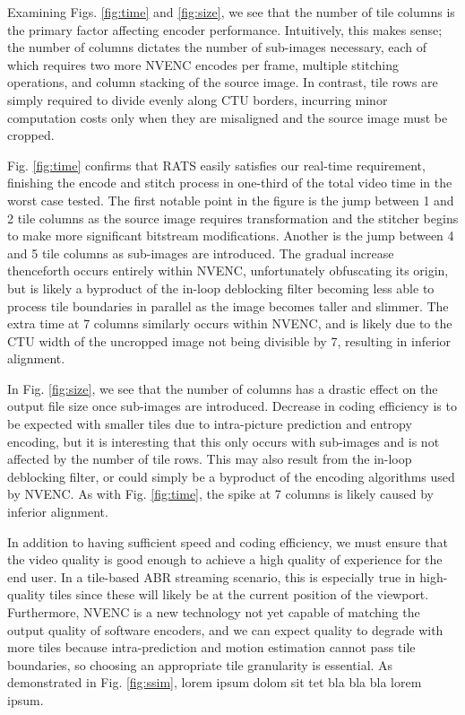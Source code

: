 Examining Figs. \ref{fig:time} and \ref{fig:size}, we see that the number of tile columns is the primary factor affecting encoder performance. Intuitively, this makes sense; the number of columns dictates the number of sub-images necessary, each of which requires two more NVENC encodes per frame, multiple stitching operations, and column stacking of the source image. In contrast, tile rows are simply required to divide evenly along CTU borders, incurring minor computation costs only when they are misaligned and the source image must be cropped.

Fig. \ref{fig:time} confirms that RATS easily satisfies our real-time requirement, finishing the encode and stitch process in one-third of the total video time in the worst case tested. The first notable point in the figure is the jump between 1 and 2 tile columns as the source image requires transformation and the stitcher begins to make more significant bitstream modifications. Another is the jump between 4 and 5 tile columns as sub-images are introduced. The gradual increase thenceforth occurs entirely within NVENC, unfortunately obfuscating its origin, but is likely a byproduct of the in-loop deblocking filter becoming less able to process tile boundaries in parallel as the image becomes taller and slimmer. The extra time at 7 columns similarly occurs within NVENC, and is likely due to the CTU width of the uncropped image not being divisible by 7, resulting in inferior alignment.

In Fig. \ref{fig:size}, we see that the number of columns has a drastic effect on the output file size once sub-images are introduced. Decrease in coding efficiency is to be expected with smaller tiles due to intra-picture prediction and entropy encoding, but it is interesting that this only occurs with sub-images and is not affected by the number of tile rows. This may also result from the in-loop deblocking filter, or could simply be a byproduct of the encoding algorithms used by NVENC. As with Fig. \ref{fig:time}, the spike at 7 columns is likely caused by inferior alignment.

In addition to having sufficient speed and coding efficiency, we must ensure that the video quality is good enough to achieve a high quality of experience for the end user. In a tile-based ABR streaming scenario, this is especially true in high-quality tiles since these will likely be at the current position of the viewport. Furthermore, NVENC is a new technology not yet capable of matching the output quality of software encoders, and we can expect quality to degrade with more tiles because intra-prediction and motion estimation cannot pass tile boundaries, so choosing an appropriate tile granularity is essential. As demonstrated in Fig. \ref{fig:ssim}, lorem ipsum dolom sit tet bla bla bla lorem ipsum.


